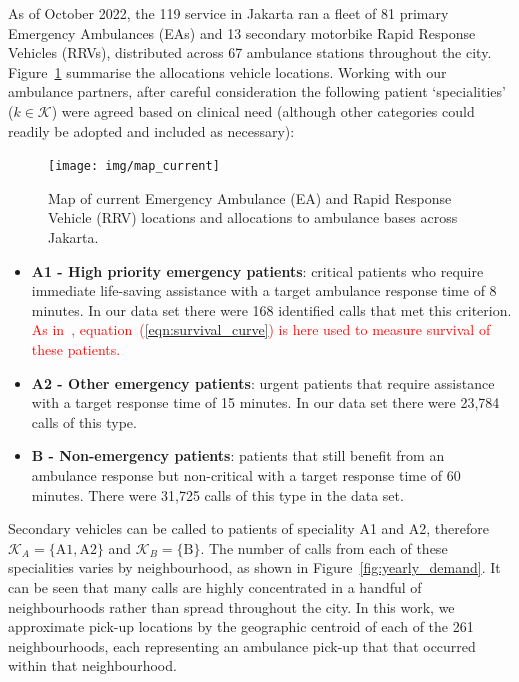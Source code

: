 \documentclass[numbers,webpdf,imaman]{ima-authoring-template}%
\begin{document}
As of October 2022, the 119 service in Jakarta ran a fleet of 81 primary
Emergency Ambulances (EAs) and 13 secondary motorbike Rapid Response Vehicles
(RRVs), distributed across 67 ambulance stations throughout the city.
Figure~\ref{fig:current_allocation} summarise the allocations vehicle
locations.
Working with our ambulance partners, after careful consideration the following
patient `specialities' ($k \in \mathcal{K}$) were agreed based on clinical need
(although other categories could readily be adopted and included as necessary):

\begin{figure}
\begin{center}
\texttt{[image: img/map\_current]}
\caption{Map of current Emergency Ambulance (EA) and Rapid Response Vehicle
         (RRV) locations and allocations to ambulance bases across Jakarta.}
\label{fig:current_allocation}
\end{center}
\end{figure}

\begin{itemize}
  \item \textbf{A1 - High priority emergency patients}: critical patients who
  require immediate life-saving assistance with a target ambulance response
  time of 8 minutes. In our data set there were 168 identified calls that met
        this criterion. \textcolor{red}{As in~\cite{Knight2012918},
        equation~(\ref{eqn:survival_curve}) is here used to measure survival of these patients.}
  \item \textbf{A2 - Other emergency patients}: urgent patients that require
  assistance with a target response time of 15 minutes. In our data set there
  were 23,784 calls of this type.
  \item \textbf{B - Non-emergency patients}: patients that still benefit from
  an ambulance response but non-critical with a target response time of 60
  minutes. There were 31,725 calls of this type in the data set.
\end{itemize}

Secondary vehicles can be called to patients of speciality A1 and A2,
therefore $\mathcal{K}_A = \{\text{A1}, \text{A2}\}$ and
$\mathcal{K}_B = \{\text{B}\}$.
The number of calls from each of these specialities varies by neighbourhood,
as shown in Figure~\ref{fig:yearly_demand}. It can be seen that many calls are
highly concentrated in a handful of neighbourhoods rather than spread
throughout the city. In this work, we approximate pick-up locations by the
geographic centroid of each of the 261 neighbourhoods, each representing an
ambulance pick-up that that occurred within that neighbourhood.
\end{document}
